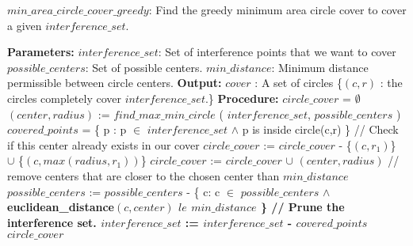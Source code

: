 \begin{algorithm}[!htb]
\caption{\textbf{$min\_area\_circle\_cover\_greedy$}: Find the greedy minimum area circle cover to cover a given $interference\_set$.}
\begin{algorithmic}
\State \textbf{Parameters:}
\State \tab $interference\_set$: Set of interference points that we want to cover
\State \tab $possible\_centers$: Set of possible centers.  
\State \tab $min\_distance$: Minimum distance permissible between circle centers. 
\State \textbf{Output:}
\State \tab $cover$ : A set of circles \{$(c,r)$ :  the circles completely 
\State \tab \tab cover $interference\_set$.\}
\State \textbf{Procedure:}
\State
\State $circle\_cover$ = $\emptyset$
\State $(center,radius)$ := $find\_max\_min\_circle$ ( $interference\_set$, 
\State \tab \tab \tab $possible\_centers$ )
\State $covered\_points$ = \{ p : p $\in$ $interference\_set$ $\wedge$ p is inside circle(c,r) \}
\State // Check if this center already exists in our cover
\State  	$circle\_cover$ := $circle\_cover$ - \{$(c,r_1)$\} $\cup$ \{$(c,max(radius,r_1))$\}
\Else 
\State 	$circle\_cover$ := $circle\_cover$ $\cup$ $(center,radius)$
\EndIf
\State // remove centers that are closer to the chosen center than $min\_distance$
\State $possible\_centers$ := $possible\_centers$ - \{ c: c $\in$ $possible\_centers$ 
\State \tab \tab \tab $\wedge$ \bf{euclidean\_distance}$(c,center)$ $le$ $min\_distance$ \}
\State // Prune the interference set.
\State $interference\_set$ := $interference\_set$ - $covered\_points$
\EndWhile
\State \Return $circle\_cover$
\end{algorithmic}
\end{algorithm}


